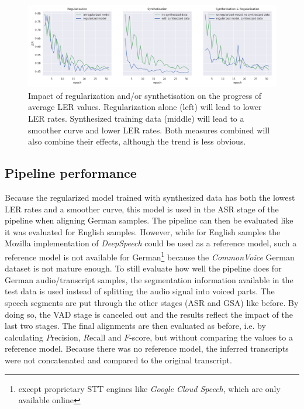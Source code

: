 \begin{figure}[h!]
	\includegraphics[width=\linewidth]{./img/regularization_synthetisation.png}
	\caption{Impact of regularization and/or synthetisation on the progress of average \ac{LER} values. Regularization alone (left) will lead to lower \ac{LER} rates. Synthesized training data (middle) will lead to a smoother curve and lower \ac{LER} rates. Both measures combined will also combine their effects, although the trend is less obvious.}
	\label{regularization_synthetisation}
\end{figure}

\subsection{Pipeline performance}

Because the regularized model trained with synthesized data has both the lowest \ac{LER} rates and a smoother curve, this model is used in the \ac{ASR} stage of the pipeline when aligning German samples. The pipeline can then be evaluated like it was evaluated for English samples. However, while for English samples the Mozilla implementation of \textit{DeepSpeech} could be used as a reference model, such a reference model is not available for German\footnote{except proprietary \ac{STT} engines like \textit{Google Cloud Speech}, which are only available online} because the \textit{CommonVoice} German dataset is not mature enough. To still evaluate how well the pipeline does for German audio/transcript samples, the segmentation information available in the test data is used instead of splitting the audio signal into voiced parts. The speech segments are put through the other stages (\ac{ASR} and \ac{GSA}) like before. By doing so, the \ac{VAD} stage is canceled out and the results reflect the impact of the last two stages. The final alignments are then evaluated as before, i.e. by calculating $P$recision, $R$ecall and $F$-score, but without comparing the values to a reference model. Because there was no reference model, the inferred transcripts were not concatenated and compared to the original transcript.

